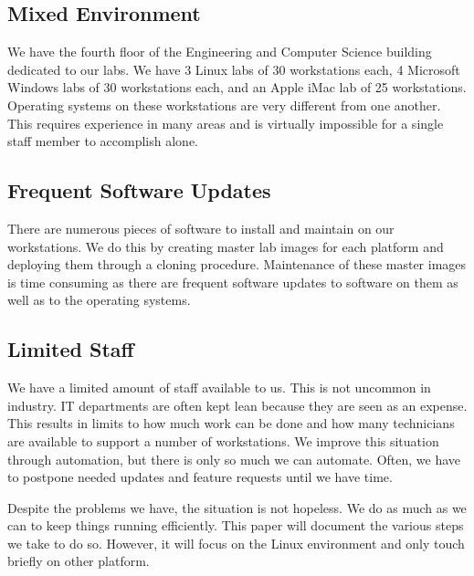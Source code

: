 \subsection{Mixed Environment}
We have the fourth floor of the Engineering and Computer Science building dedicated to our labs.  We have 3 Linux labs of 30 workstations each, 4 Microsoft Windows labs of 30 workstations each, and an Apple iMac lab of 25 workstations.  Operating systems on these workstations are very different from one another.  This requires experience in many areas and is virtually impossible for a single staff member to accomplish alone.   

\subsection{Frequent Software Updates}
There are numerous pieces of software to install and maintain on our workstations.  We do this by creating master lab images for each platform and deploying them through a cloning procedure.  Maintenance of these master images is time consuming as there are frequent software updates to software on them as well as to the operating systems.  

\subsection{Limited Staff}
We have a limited amount of staff available to us.  This is not uncommon in industry.  IT departments are often kept lean because they are seen as an expense.  This results in limits to how much work can be done and how many technicians are available to support a number of workstations.  We improve this situation through automation, but there is only so much we can automate.  Often, we have to postpone needed updates and feature requests until we have time.   




Despite the problems we have, the situation is not hopeless.  We do as much as we can to keep things running efficiently.  This paper will document the various steps we take to do so.  However, it will focus on the Linux environment and only touch briefly on other platform.  
